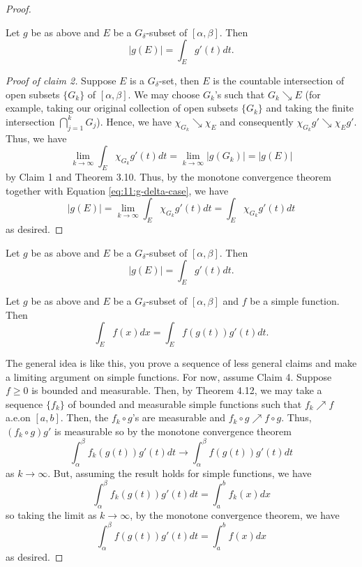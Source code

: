 \begin{proof}
\begin{claim}
Let $g$ be as above and $E$ be a $G_\delta$-subset of
$[\alpha,\beta]$. Then
\[
|g(E)|=\int_E g'(t)dt.
\]
\end{claim}
\begin{proof}[Proof of claim 2]
\renewcommand\qedsymbol{$\clubsuit$}
Suppose $E$ is a $G_\delta$-set, then $E$ is the countable intersection of
open subsets $\{G_k\}$ of $[\alpha,\beta]$. We may choose $G_k$'s such that
$G_k\searrow E$ (for example, taking our original collection of open
subsets $\{G_k\}$ and taking the finite intersection $\bigcap_{j=1}^k
G_j$). Hence, we have $\chi_{G_k}\searrow\chi_E$ and consequently
$\chi_{G_k}g'\searrow\chi_Eg'$. Thus, we have
\begin{equation}
\label{eq:11:g-delta-case}
\lim_{k\to\infty}\int_E\chi_{G_k}g'(t)dt
=\lim_{k\to\infty}|g(G_k)|
=|g(E)|
\end{equation}
by Claim 1 and Theorem 3.10. Thus, by the monotone convergence theorem
together with Equation \eqref{eq:11:g-delta-case}, we have
\begin{equation}
\label{eq:11:apply-mct}
|g(E)|=\lim_{k\to\infty}\int_E\chi_{G_k}g'(t)dt=\int_E\chi_{G_k}g'(t)dt
\end{equation}
as desired.
\end{proof}
\begin{claim}
Let $g$ be as above and $E$ be a $G_\delta$-subset of
$[\alpha,\beta]$. Then
\[
|g(E)|=\int_E g'(t)dt.
\]
\end{claim}
\begin{claim}
Let $g$ be as above and $E$ be a $G_\delta$-subset of
$[\alpha,\beta]$ and $f$ be a simple function. Then
\[
\int_Ef(x)dx=\int_E f(g(t))g'(t)dt.
\]
\end{claim}

The general idea is like this, you prove a sequence of less general claims
and make a limiting argument on simple functions. For now, assume Claim
4. Suppose $f\geq 0$ is bounded and measurable. Then, by Theorem 4.12, we
may take a sequence $\{f_k\}$ of bounded and measurable simple functions
such that $f_k\nearrow f$ a.e.\@ on $[a,b]$. Then, the $f_k\circ g$'s are
measurable and $f_k\circ g\nearrow f\circ g$. Thus, $(f_k\circ g)g'$ is
measurable so by the monotone convergence theorem
\[
\int_\alpha^\beta f_k(g(t))g'(t)dt\longrightarrow\int_\alpha^\beta f(g(t))g'(t)dt
\]
as $k\to\infty$. But, assuming the result holds for simple functions, we
have
\[
\int_\alpha^\beta f_k(g(t))g'(t)dt=\int_a^bf_k(x)dx
\]
so taking the limit as $k\to\infty$, by the monotone convergence theorem,
we have
\[
\int_\alpha^\beta f(g(t))g'(t)dt=\int_a^b f(x)dx
\]
as desired.
\end{proof}
\newpage

